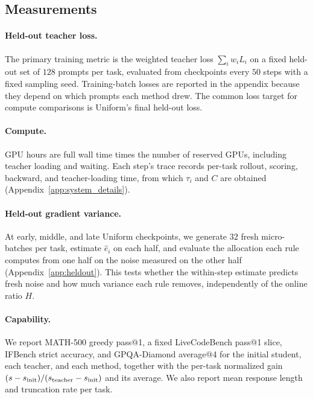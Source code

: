 \subsection{Measurements}

\paragraph{Held-out teacher loss.} The primary training metric is the
weighted teacher loss $\sum_i w_iL_i$ on a fixed held-out set of $128$ prompts
per task, evaluated from checkpoints every $50$ steps with a fixed sampling
seed. Training-batch losses are reported in the appendix because they depend
on which prompts each method drew. The common loss target for compute
comparisons is Uniform's final held-out loss.

\paragraph{Compute.} GPU hours are full wall time times the number of reserved
GPUs, including teacher loading and waiting. Each step's trace records
per-task rollout, scoring, backward, and teacher-loading time, from which
$\tau_i$ and $C$ are obtained (Appendix~\ref{app:system_details}).

\paragraph{Held-out gradient variance.} At early, middle, and late Uniform
checkpoints, we generate $32$ fresh micro-batches per task, estimate
$\widehat e_i$ on each half, and evaluate the allocation each rule computes
from one half on the noise measured on the other half
(Appendix~\ref{app:heldout}). This tests whether the within-step estimate
predicts fresh noise and how much variance each rule removes, independently
of the online ratio $H$.

\paragraph{Capability.} We report MATH-500 greedy pass@1, a fixed
LiveCodeBench pass@1 slice, IFBench strict accuracy, and GPQA-Diamond
average@4 for the initial student, each teacher, and each method, together
with the per-task normalized gain
$(s-s_{\rm init})/(s_{\rm teacher}-s_{\rm init})$ and its average.
 We also report mean response length and truncation rate per
task.

